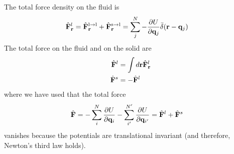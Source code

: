 \documentclass[b5paper,openright,11pt]{book}
\begin{document}
\begin{appendices}
The total force density on the fluid is
\begin{align}
  \hat{\bf F}^l_{\bf r}&=\hat{\bf F}^{\rm l\to l}_{\bf r}+\hat{\bf F}^{\rm s\to l}_{\bf r} =\sum^{N}_{j}-\frac{\partial U}{\partial {\bf q}_{j}}\bar{\delta}({\bf r}-{\bf q}_j)
\end{align}
The total force on the fluid and on the solid are
\begin{align}
  \hat{\bf F}^l&=\int d{\bf r}\hat{\bf F}^l_{\bf r}
\nonumber\\
  \hat{\bf F}^s&= -\hat{\bf F}^l
\end{align}
where we have used that the total force
\begin{align}
  \hat{\bf F}&=-\sum^N_{i}\frac{\partial U}{\partial {\bf q}_i}
-\sum^{N'}_{i'}\frac{\partial U}{\partial {\bf q}_{i'}}
=\hat{\bf F}^l+\hat{\bf F}^s
\end{align}
 vanishes because the  potentials are translational invariant (and
therefore, Newton's third law holds).


\end{appendices}
\end{document}
